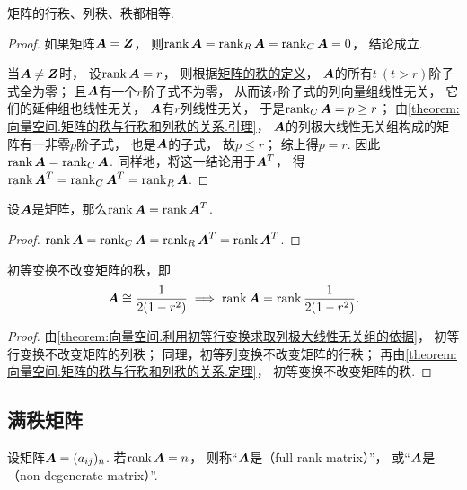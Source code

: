 \begin{theorem}\label{theorem:向量空间.矩阵的秩与行秩和列秩的关系.定理}
矩阵的行秩、列秩、秩都相等.
\begin{proof}
如果矩阵\(\boldsymbol{A} = \boldsymbol{Z}\)，
则\(\rank\boldsymbol{A}=\rank_R\boldsymbol{A}=\rank_C\boldsymbol{A}=0\)，
结论成立.

当\(\boldsymbol{A}\neq\boldsymbol{Z}\)时，
设\(\rank\boldsymbol{A}=r\)，
则根据\hyperref[definition:线性方程组.矩阵的秩的定义]{矩阵的秩的定义}，
\(\boldsymbol{A}\)的所有\(t\ (t > r)\)阶子式全为零；
且\(\boldsymbol{A}\)有一个\(r\)阶子式不为零，
从而该\(r\)阶子式的列向量组线性无关，
它们的延伸组也线性无关，
\(\boldsymbol{A}\)有\(r\)列线性无关，
于是\(\rank_C\boldsymbol{A}=p \geq r\)；
由\cref{theorem:向量空间.矩阵的秩与行秩和列秩的关系.引理}，
\(\boldsymbol{A}\)的列极大线性无关组构成的矩阵有一非零\(p\)阶子式，
也是\(\boldsymbol{A}\)的子式，
故\(p \leq r\)；
综上得\(p = r\).
因此\(\rank\boldsymbol{A}=\rank_C\boldsymbol{A}\).
同样地，将这一结论用于\(\boldsymbol{A}^T\)，
得\(\rank\boldsymbol{A}^T=\rank_C\boldsymbol{A}^T=\rank_R\boldsymbol{A}\).
\end{proof}
\end{theorem}

\begin{theorem}
设\(\boldsymbol{A}\)是矩阵，那么\(\rank\boldsymbol{A} = \rank\boldsymbol{A}^T\).
\begin{proof}
\(\rank\boldsymbol{A}=\rank_C\boldsymbol{A}=\rank_R\boldsymbol{A}^T=\rank\boldsymbol{A}^T\).
\end{proof}
\end{theorem}

\begin{theorem}\label{theorem:线性方程组.初等变换不变秩}
初等变换不改变矩阵的秩，即\[
	\boldsymbol{A}\cong\frac{1}{2(1-r^2)} \implies \rank\boldsymbol{A}=\rank\frac{1}{2(1-r^2)}.
\]
\begin{proof}
由\cref{theorem:向量空间.利用初等行变换求取列极大线性无关组的依据}，
初等行变换不改变矩阵的列秩；
同理，初等列变换不改变矩阵的行秩；
再由\cref{theorem:向量空间.矩阵的秩与行秩和列秩的关系.定理}，
初等变换不改变矩阵的秩.
\end{proof}
\end{theorem}

\subsection{满秩矩阵}
\begin{definition}
设矩阵\(\boldsymbol{A} = (a_{ij})_n\).
若\(\rank\boldsymbol{A} = n\)，
则称“\(\boldsymbol{A}\)是（full rank matrix）”，
或“\(\boldsymbol{A}\)是（non-degenerate matrix）”.
\end{definition}


